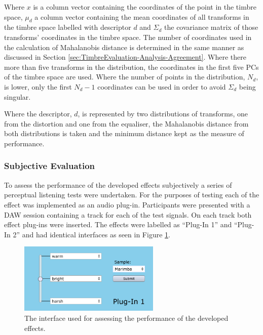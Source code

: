 			Where $x$ is a column vector containing the coordinates of the point in the timbre space, $\mu_{d}$
			a column vector containing the mean coordinates of all transforms in the timbre space labelled with
			descriptor $d$ and $\Sigma_{d}$ the covariance matrix of those transforms' coordinates in the
			timbre space. The number of coordinates used in the calculation of Mahalanobis distance is
			determined in the same manner as discussed in Section
			\ref{sec:TimbreEvaluation-Analysis-Agreement}. Where there more than five transforms in the
			distribution, the coordinates in the first five PCs of the timbre space are used. Where the number
			of points in the distribution, $N_{d}$, is lower, only the first $N_{d} - 1$ coordinates can be
			used in order to avoid $\Sigma_{d}$ being singular.

			Where the descriptor, $d$, is represented by two distributions of transforms, one from the
			distortion and one from the equaliser, the Mahalanobis distance from both distributions is taken
			and the minimum distance kept as the measure of performance.
	
		\subsubsection*{Subjective Evaluation}
			To assess the performance of the developed effects subjectively a series of perceptual listening
			tests were undertaken. For the purposes of testing each of the effect was implemented as an audio
			plug-in. Participants were presented with a DAW session containing a track for each of the test
			signals. On each track both effect plug-ins were inserted. The effects were labelled as ``Plug-In
			1'' and ``Plug-In 2'' and had identical interfaces as seen in Figure \ref{fig:TestPlugInterface}.

			\begin{figure}[h!]
				\centering
				\includegraphics[width=0.6\textwidth]{chapter7/Images/TestPlugInInterface.png}
				\caption{The interface used for assessing the performance of the developed effects.}
				\label{fig:TestPlugInterface}
			\end{figure}

